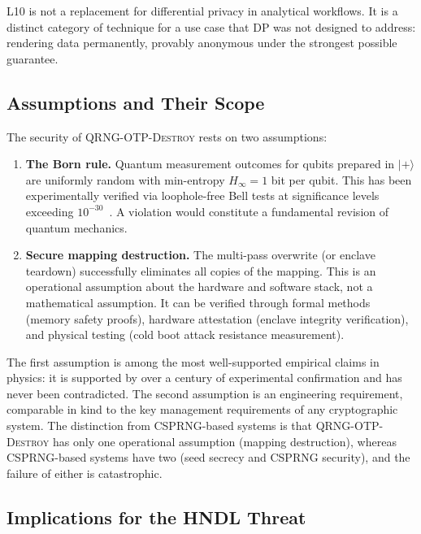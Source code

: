 \documentclass[journal]{IEEEtran}
\begin{document}
L10 is not a replacement for differential privacy in analytical workflows. It is a distinct category of technique for a use case that DP was not designed to address: rendering data permanently, provably anonymous under the strongest possible guarantee.

\subsection{Assumptions and Their Scope}
\label{subsec:assumptions}

The security of \textsc{QRNG-OTP-Destroy} rests on two assumptions:

\begin{enumerate}
\item \textbf{The Born rule.} Quantum measurement outcomes for qubits prepared in $|{+}\rangle$ are uniformly random with min-entropy $H_\infty = 1$ bit per qubit. This has been experimentally verified via loophole-free Bell tests at significance levels exceeding $10^{-30}$~\cite{hensen2015loophole}. A violation would constitute a fundamental revision of quantum mechanics.

\item \textbf{Secure mapping destruction.} The multi-pass overwrite (or enclave teardown) successfully eliminates all copies of the mapping. This is an operational assumption about the hardware and software stack, not a mathematical assumption. It can be verified through formal methods (memory safety proofs), hardware attestation (enclave integrity verification), and physical testing (cold boot attack resistance measurement).
\end{enumerate}

The first assumption is among the most well-supported empirical claims in physics: it is supported by over a century of experimental confirmation and has never been contradicted. The second assumption is an engineering requirement, comparable in kind to the key management requirements of any cryptographic system. The distinction from CSPRNG-based systems is that \textsc{QRNG-OTP-Destroy} has only one operational assumption (mapping destruction), whereas CSPRNG-based systems have two (seed secrecy and CSPRNG security), and the failure of either is catastrophic.

\subsection{Implications for the HNDL Threat}
\label{subsec:hndl}
\end{document}
